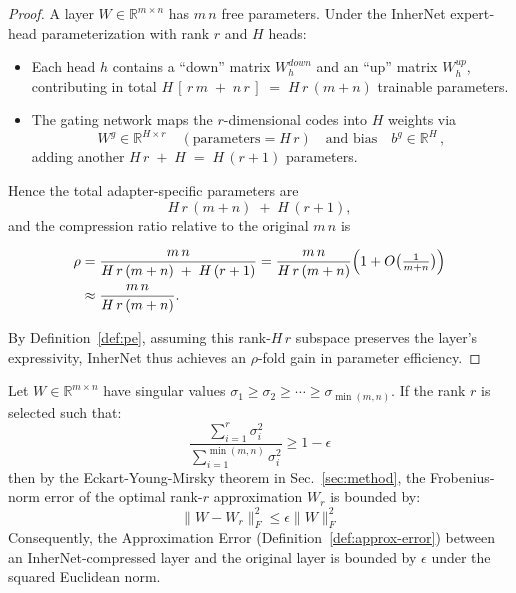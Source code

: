 \documentclass{article} %
\begin{document}
\begin{proof}
A layer \(W\in\mathbb{R}^{m\times n}\) has \(m\,n\) free parameters.  Under the InherNet expert‐head parameterization with rank \(r\) and \(H\) heads:

\begin{itemize}[leftmargin=*]
  \item Each head \(h\) contains a “down” matrix \(W^{down}_h\) and an “up” matrix   \(W^{up}_h \), contributing in total $H\,[\,r\,m\;+\;n\,r\,]
      \;=\;
      H\,r\,(m+n)$ trainable parameters.
  \item The gating network maps the \(r\)-dimensional codes into \(H\) weights via
    \[
      W^g\in\mathbb{R}^{H\times r}\quad(\text{parameters}=H\,r)
      \quad\text{and bias}\quad b^g\in\mathbb{R}^H\,,
    \]
    adding another $H\,r \;+\; H \;=\; H\,(r+1)$ parameters.
\end{itemize}

Hence the total adapter‐specific parameters are
\[
  H\,r\,(m+n)\;+\;H\,(r+1),
\]
and the compression ratio relative to the original \(m\,n\) is

\begin{equation}
\begin{aligned}
\rho
&= \frac{m\,n}{H\,r\,(m+n)\;+\;H\,(r+1)}
= \frac{m\,n}{H\,r\,(m+n)}
\Bigl(1 + O\bigl(\tfrac1{m+n}\bigr)\Bigr) \\
&\approx \frac{m\,n}{H\,r\,(m+n)}.
\nonumber
\end{aligned}
\end{equation}

By Definition~\ref{def:pe}, assuming this rank-\(H\,r\) subspace preserves the layer's expressivity, InherNet thus achieves an \(\rho\)-fold gain in parameter efficiency.
\end{proof}

\begin{lemma}
\label{lem:spectral}
Let $W \in \mathbb{R}^{m \times n}$ have singular values $\sigma_1 \ge \sigma_2 \ge \cdots \ge \sigma_{\min(m,n)}$. If the rank $r$ is selected such that:
\begin{equation}
\frac{\sum_{i=1}^{r} \sigma_i^2}{\sum_{i=1}^{\min(m,n)} \sigma_i^2} \ge 1 - \epsilon
\end{equation}
then by the Eckart-Young-Mirsky theorem in Sec.~\ref{sec:method}, the Frobenius-norm error of the optimal rank-$r$ approximation $W_r$ is bounded by:
\begin{equation}
\|W - W_r\|_F^2 \leq \epsilon\|W\|_F^2
\end{equation}
Consequently, the Approximation Error (Definition~\ref{def:approx-error}) between an InherNet-compressed layer and the original layer is bounded by $\epsilon$ under the squared Euclidean norm.
\end{lemma}
\end{document}
